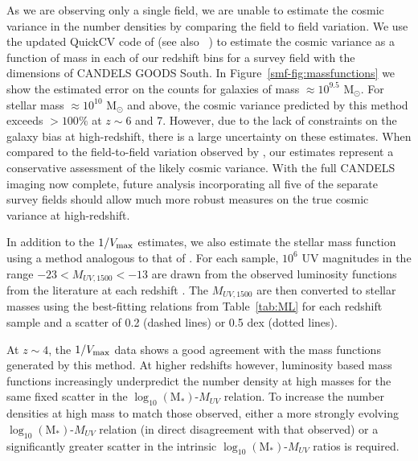 As we are observing only a single field, we are unable to estimate the cosmic variance in the number densities by comparing the field to field variation. We use the updated QuickCV code of \citet{Moster:2011ip} (see also \citeauthor{Newman:2002fa}~\citeyear{Newman:2002fa}) to estimate the cosmic variance as a function of mass in each of our redshift bins for a survey field with the dimensions of CANDELS GOODS South. In Figure~\ref{smf-fig:massfunctions} we show the estimated error on the counts for galaxies of mass $\approx 10^{9.5}$ M$_{\odot}$. For stellar mass $\approx 10^{10}$ M$_{\odot}$ and above, the cosmic variance predicted by this method exceeds $>100\%$ at $z \sim 6$ and 7. However, due to the lack of constraints on the galaxy bias at high-redshift, there is a large uncertainty on these estimates. When compared to the field-to-field variation observed by \citet{2012ApJ...752...66L}, our estimates represent a conservative assessment of the likely cosmic variance. With the full CANDELS imaging now complete, future analysis incorporating all five of the separate survey fields should allow much more robust measures on the true cosmic variance at high-redshift.

In addition to the $1/V_{\rm{max}}$ estimates, we also estimate the stellar mass function using a method analogous to that of \citet{Gonzalez:2011dn}. For each sample, $10^6$ UV magnitudes in the range $-23 < M_{UV,1500} < -13$ are drawn from the observed luminosity functions from the literature at each redshift \citep{2007ApJ...670..928B,Anonymous:96uKWdy6,McLure:2013hh}. The $M_{UV,1500}$ are then converted to stellar masses using the best-fitting relations from Table~\ref{tab:ML} for each redshift sample and a scatter of 0.2 (dashed lines) or 0.5 dex (dotted lines).

At $z \sim 4$, the $1/V_{\rm{max}}$ data shows a good agreement with the mass functions generated by this method. At higher redshifts however, luminosity based mass functions increasingly underpredict the number density at high masses for the same fixed scatter in the $\log_{10} (\text{M}_{*})$-$M_{UV}$ relation. To increase the number densities at high mass to match those observed, either a more strongly evolving $\log_{10} (\text{M}_{*})$-$M_{UV}$ relation (in direct disagreement with that observed) or a significantly greater scatter in the intrinsic $\log_{10} (\text{M}_{*})$-$M_{UV}$ ratios is required. 

